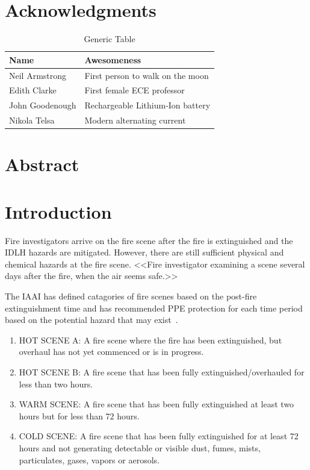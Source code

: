 \documentclass[12pt,oneside]{book}
\begin{document}
\mainmatter

\chapter*{Acknowledgments}

\begin{table}[!ht]
	\centering
	\caption*{Generic Table}
	\begin{tabular}{ll}
		\toprule[1.5pt]
		Name & Awesomeness \\ 
		\midrule
		Neil Armstrong		 & First person to walk on the moon \\
		Edith Clarke		 & First female ECE professor \\
		John Goodenough		 & Rechargeable Lithium-Ion battery \\
		Nikola Telsa		 & Modern alternating current \\  
		\bottomrule[1.25pt]
	\end{tabular}
\end{table}

\newpage

\chapter*{Abstract}

\newpage
\chapter{Introduction}
\label{chap:intro}
\setcounter{page}{1}

Fire investigators arrive on the fire scene after the fire is extinguished and the IDLH hazards are mitigated.  However, there are still sufficient physical and chemical hazards at the fire scene. 
 <<Fire investigator examining a scene several days after the fire, when the air seems safe.>>

The IAAI has defined catagories of fire scenes based on the post-fire extinguishment time and has recommended PPE protection for each time period based on the potential hazard that may exist~\cite{IAAI:2020}.   

\begin{enumerate}
\item HOT SCENE A: A fire scene where the fire has been extinguished, but overhaul has not yet commenced or is in progress.

\item HOT SCENE B: A fire scene that has been fully extinguished/overhauled for less than two hours.

\item  WARM SCENE: A fire scene that has been fully extinguished at least two hours but for less than 72 hours. 

\item COLD SCENE: A fire scene that has been fully extinguished for at least 72 hours and not generating detectable or visible dust, fumes, mists, particulates, gases, vapors or aerosols.

\end{enumerate}
\end{document}
